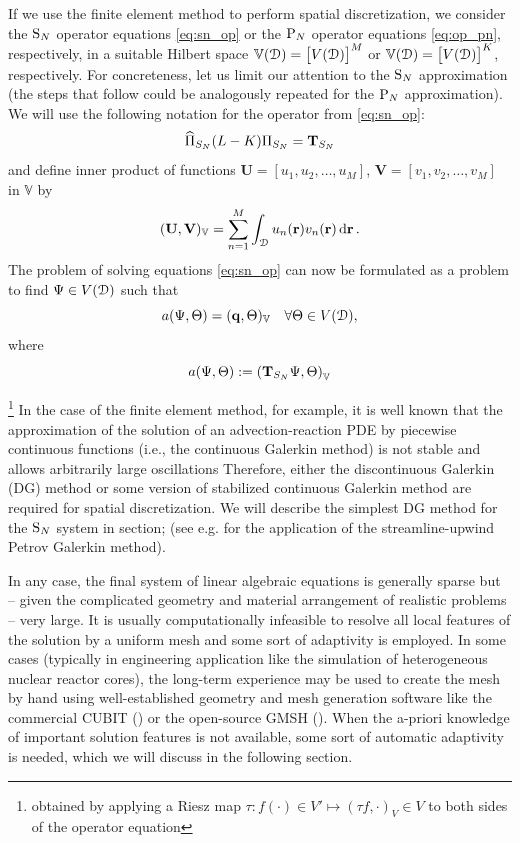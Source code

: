 If we use the finite element method to perform spatial discretization, we consider the $\SN$ operator equations 
\eqref{eq:sn_op} or the $\PN$ operator equations \eqref{eq:op_pn}, respectively, in a suitable Hilbert space
$\mathbb{V}(\VV) = \bigl[V(\VV)\bigr]^M$ or $\mathbb{V}(\VV) = \bigl[V(\VV)\bigr]^K$, respectively. For concreteness,
let us limit our attention to the $\SN$ approximation (the steps that follow could be analogously repeated for
the $\PN$ approximation). We will use the following notation for the operator from \eqref{eq:sn_op}:
$$
	\PihSN (L-K) \PiSN = \mat{T}_{S_N}
$$ 
and define inner product of functions $\mathbf{U} = [u_1,u_2,\ldots,u_M]$, $\mathbf{V} = [v_1,v_2,\ldots,v_M]$ in
$\mathbb{V}$ by 
$$
\ip{\mathbb{V}}{\mathbf{U},\mathbf{V}} = \sum_{n=1}^M \int_{\VV} u_n(\br) v_n(\br)\,\d{\br}.
$$
The problem of solving equations \eqref{eq:sn_op} can now be formulated as a problem
to find $\Psi \in V(\VV)$ such that
\begin{equation}\label{eq:weak1}
	a(\Psi,\Theta) = (\mat{q}, \Theta)_\mathbb{V} \quad \forall \Theta\in V(\VV),
\end{equation}
where
$$
	a(\Psi,\Theta) := \left(\mat{T}_{S_N} \Psi, \Theta\right)_\mathbb{V}
$$
  
\footnote{obtained by applying a Riesz map $\tau : f(\cdot)\in V' \mapsto (\tau f,\cdot)_V \in V$ to both sides of the
operator equation} In the case of the finite element method, for
example, it is well known that the approximation of the solution of an advection-reaction PDE by piecewise continuous functions (i.e.,
the continuous Galerkin method) is not stable and allows arbitrarily large oscillations Therefore, either the
discontinuous Galerkin (DG) method or some version of stabilized continuous Galerkin method are required for spatial discretization. We will describe the simplest DG method for the $\SN$ system in \alert{section};
(see e.g. \cite{Meinkohn} for the application of the streamline-upwind Petrov Galerkin method).


In any case, the final system of linear algebraic equations is generally sparse but -- given the complicated geometry
and material arrangement of realistic problems -- very large. It is usually computationally infeasible to resolve all
local features of the solution by a uniform mesh and some sort of adaptivity is employed. In some cases (typically in
engineering application like the simulation of heterogeneous nuclear reactor cores), the long-term experience may be
used to create the mesh by hand using well-established geometry and mesh generation software like the commercial CUBIT
(\cite{CUBIT}) or the open-source GMSH (\cite{GMSH}). When the a-priori knowledge of important solution features is not
available, some sort of automatic adaptivity is needed, which we will discuss in the following section.

